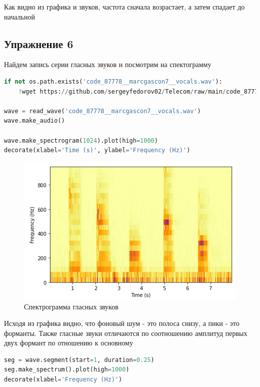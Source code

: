 Как видно из графика и звуков, частота сначала возрастает, а затем спадает до начальной


\subsection{Упражнение 6}

Найдем запись серии гласных звуков и посмотрим на спектограмму

\begin{lstlisting}[language=Python]
if not os.path.exists('code_87778__marcgascon7__vocals.wav'):
    !wget https://github.com/sergeyfedorov02/Telecom/raw/main/code_87778__marcgascon7__vocals.wav
    
wave = read_wave('code_87778__marcgascon7__vocals.wav')
wave.make_audio()

wave.make_spectrogram(1024).plot(high=1000)
decorate(xlabel='Time (s)', ylabel='Frequency (Hz)')
\end{lstlisting}

\begin{figure}[H]
	\begin{center}
		\includegraphics[scale=1]{fig/lab03/lab03_14.png}
		\caption{Спектрограмма гласных звуков}
	\end{center}
\end{figure}

Исходя из графика видно, что фоновый шум - это полоса снизу, а пики - это форманты. Также гласные звуки отличаются по соотношению амплитуд первых двух формант по отношению к основному

\begin{lstlisting}[language=Python]
seg = wave.segment(start=1, duration=0.25)
seg.make_spectrum().plot(high=1000)
decorate(xlabel='Frequency (Hz)')
\end{lstlisting}

